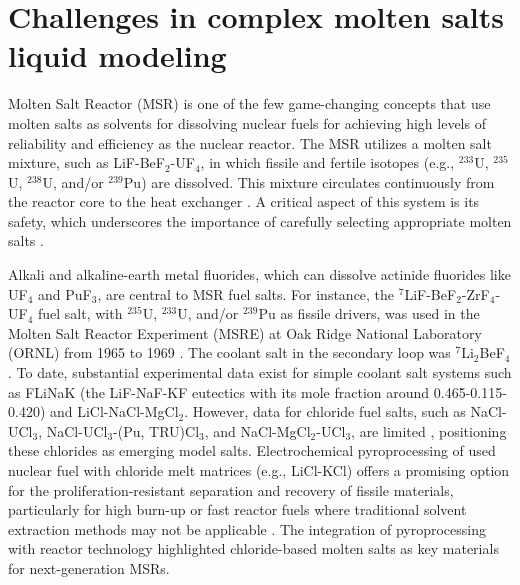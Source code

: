 \section{Challenges in complex molten salts liquid modeling } \label{intro:sec:moltensalts}
Molten Salt Reactor (MSR) is one of the few game-changing concepts that use molten salts as solvents for dissolving nuclear fuels \cite{blander1964molten, abram2008generation, cottrell1955operation} for achieving high levels of reliability and efficiency as the nuclear reactor. The MSR utilizes a molten salt mixture, such as LiF-BeF$_2$-UF$_4$, in which fissile and fertile isotopes (e.g., $^{233}$U, $^{235}$U, $^{238}$U, and/or $^{239}$Pu) are dissolved. This mixture circulates continuously from the reactor core to the heat exchanger \cite{blander1964molten, leblanc2010molten}. A critical aspect of this system is its safety, which underscores the importance of carefully selecting appropriate molten salts \cite{benevs2013thermodynamic}.

Alkali and alkaline-earth metal fluorides, which can dissolve actinide fluorides like UF$_4$ and PuF$_3$, are central to MSR fuel salts. For instance, the $^7$LiF-BeF$_2$-ZrF$_4$-UF$_4$ fuel salt, with $^{235}$U, $^{233}$U, and/or $^{239}$Pu as fissile drivers, was used in the Molten Salt Reactor Experiment (MSRE) at Oak Ridge National Laboratory (ORNL) from 1965 to 1969 \cite{blander1964molten}. The coolant salt in the secondary loop was $^7$Li$_2$BeF$_4$. To date, substantial experimental data exist for simple coolant salt systems such as FLiNaK (the LiF-NaF-KF eutectics with its mole fraction around 0.465-0.115-0.420) and LiCl-NaCl-MgCl$_2$. However, data for chloride fuel salts, such as NaCl-UCl$_3$, NaCl-UCl$_3$-(Pu, TRU)Cl$_3$, and NaCl-MgCl$_2$-UCl$_3$, are limited \cite{mourogov2006potentialities}, positioning these chlorides as emerging model salts. Electrochemical pyroprocessing of used nuclear fuel with chloride melt matrices (e.g., LiCl-KCl) offers a promising option for the proliferation-resistant separation and recovery of fissile materials, particularly for high burn-up or fast reactor fuels where traditional solvent extraction methods may not be applicable \cite{blander1964molten}. The integration of pyroprocessing with reactor technology highlighted chloride-based molten salts as key materials for next-generation MSRs.

